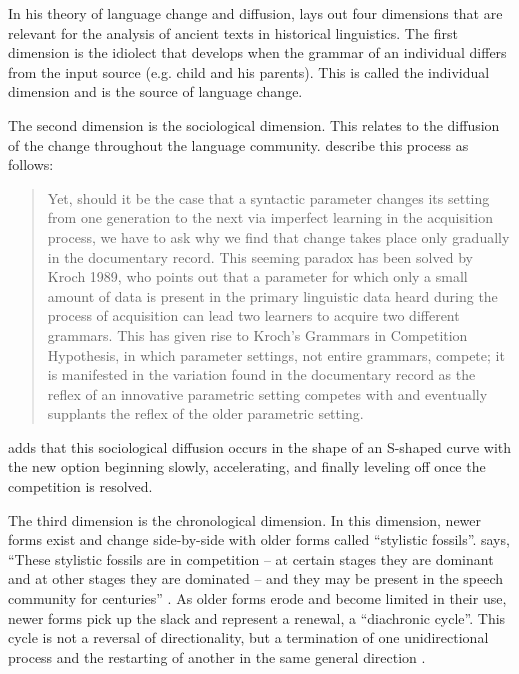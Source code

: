 ﻿\documentclass[output=paper]{langsci/langscibook}
\begin{document}
In his theory of language change and diffusion, \citet{Naude2012} lays out four dimensions that are relevant for the analysis of ancient texts in historical linguistics. The first dimension is the idiolect that develops when the grammar of an individual differs from the input source (e.g. child and his parents). This is called the individual dimension and is the source of language change. 

The second dimension is the sociological dimension. This relates to the diffusion of the change throughout the language community. \citet[214]{RingeEska2013} describe this process as follows:
%
\begin{quote}
Yet, should it be the case that a syntactic parameter changes its setting
from one generation to the next via imperfect learning in the acquisition
process, we have to ask why we find that change takes place only gradually
in the documentary record. This seeming paradox has been solved by Kroch
1989, who points out that a parameter for which only a small amount of data
is present in the primary linguistic data heard during the process of
acquisition can lead two learners to acquire two different grammars. This
has given rise to Kroch's Grammars in Competition Hypothesis, in which parameter settings, not entire grammars, compete; it is manifested in the variation found in the documentary record as the reflex of an innovative parametric setting competes with and eventually supplants the reflex of the older parametric setting.
\end{quote}
%
\citeauthor{Naude2012} adds that this sociological diffusion occurs in the shape of an S-shaped curve with the new option beginning slowly, accelerating, and finally leveling off once the competition is resolved.

The third dimension is the chronological dimension. In this dimension,
newer forms exist and change side-by-side with older forms called
``stylistic fossils''. \citeauthor{Naude2012} says, ``These stylistic
fossils are in competition -- at certain stages they are dominant and at
other stages they are dominated -- and they may be present in the speech
community for centuries'' \parencite[73]{Naude2012}. As older forms erode
and become limited in their use, newer forms pick up the slack and
represent a renewal, a ``diachronic cycle''. This cycle is not a reversal
of directionality, but a termination of one unidirectional process and the
restarting of another in the same general direction \parencite[73]{Naude2012}.  
\end{document}
